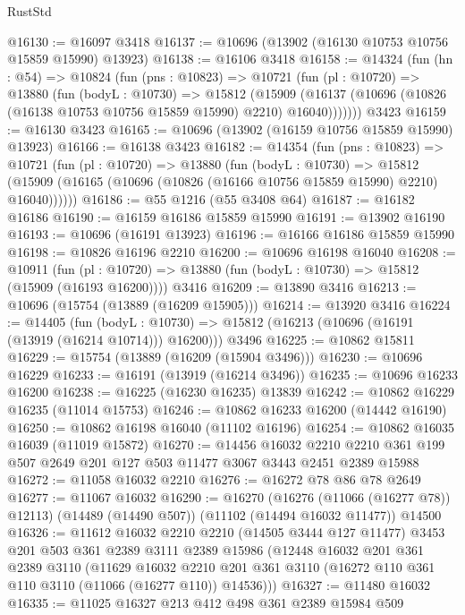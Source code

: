 \begin{lexlean}{RustStd}
\begin{coremodule}
@16130 := @16097 @3418
@16137 := @10696 (@13902 (@16130 @10753 @10756 @15859 @15990) @13923)
@16138 := @16106 @3418
@16158 := @14324
    (fun (hn : @54) =>
    @10824
      (fun (pns : @10823) =>
      @10721
        (fun (pl : @10720) =>
        @13880
          (fun (bodyL : @10730) =>
          @15812
            (@15909
              (@16137 (@10696 (@10826 (@16138 @10753 @10756 @15859 @15990) @2210) @16040)))))))
    @3423
@16159 := @16130 @3423
@16165 := @10696 (@13902 (@16159 @10756 @15859 @15990) @13923)
@16166 := @16138 @3423
@16182 := @14354
    (fun (pns : @10823) =>
    @10721
      (fun (pl : @10720) =>
      @13880
        (fun (bodyL : @10730) =>
        @15812 (@15909 (@16165 (@10696 (@10826 (@16166 @10756 @15859 @15990) @2210) @16040))))))
@16186 := @55 @1216 (@55 @3408 @64)
@16187 := @16182 @16186
@16190 := @16159 @16186 @15859 @15990
@16191 := @13902 @16190
@16193 := @10696 (@16191 @13923)
@16196 := @16166 @16186 @15859 @15990
@16198 := @10826 @16196 @2210
@16200 := @10696 @16198 @16040
@16208 := @10911
    (fun (pl : @10720) => @13880 (fun (bodyL : @10730) => @15812 (@15909 (@16193 @16200))))
    @3416
@16209 := @13890 @3416
@16213 := @10696 (@15754 (@13889 (@16209 @15905)))
@16214 := @13920 @3416
@16224 := @14405
    (fun (bodyL : @10730) => @15812 (@16213 (@10696 (@16191 (@13919 (@16214 @10714))) @16200)))
    @3496
@16225 := @10862 @15811
@16229 := @15754 (@13889 (@16209 (@15904 @3496)))
@16230 := @10696 @16229
@16233 := @16191 (@13919 (@16214 @3496))
@16235 := @10696 @16233 @16200
@16238 := @16225 (@16230 @16235) @13839
@16242 := @10862 @16229 @16235 (@11014 @15753)
@16246 := @10862 @16233 @16200 (@14442 @16190)
@16250 := @10862 @16198 @16040 (@11102 @16196)
@16254 := @10862 @16035 @16039 (@11019 @15872)
@16270 := @14456
    @16032
    @2210
    @2210
    @361
    @199
    @507
    @2649
    @201
    @127
    @503
    @11477
    @3067
    @3443
    @2451
    @2389
    @15988
@16272 := @11058 @16032 @2210
@16276 := @16272 @78 @86 @78 @2649
@16277 := @11067 @16032
@16290 := @16270
    (@16276 (@11066 (@16277 @78)) @12113)
    (@14489 (@14490 @507))
    (@11102 (@14494 @16032 @11477))
    @14500
@16326 := @11612
    @16032
    @2210
    @2210
    (@14505 @3444 @127 @11477)
    @3453
    @201
    @503
    @361
    @2389
    @3111
    @2389
    @15986
    (@12448
      @16032
      @201
      @361
      @2389
      @3110
      (@11629
        @16032
        @2210
        @201
        @361
        @3110
        (@16272 @110 @361 @110 @3110 (@11066 (@16277 @110)) @14536)))
@16327 := @11480 @16032
@16335 := @11025 @16327 @213 @412 @498 @361 @2389 @15984 @509

\end{coremodule}
\end{lexlean}
